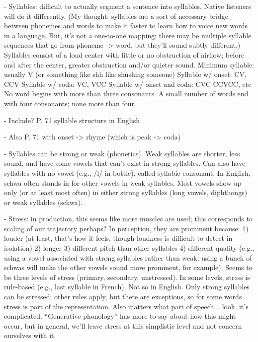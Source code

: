 - Syllables: difficult to actually segment a sentence into syllables.
  Native listeners will do it differently. (My thought: syllables
  are a sort of necessary bridge between phonemes and words to make
  it faster to learn how to voice new words in a language. But,
  it's not a one-to-one mapping; there may be multiple syllable
  sequences that go from phoneme -> word, but they'll sound subtly different.)
  Syllables consist of a loud center with little or no obstruction
  of airflow; before and after the center, greater obstruction and/or
  quieter sound.
  Minimum syllable: usually V (or something like shh like shushing someone)
  Syllable w/ onset: CV, CCV
  Syllable w/ coda: VC, VCC
  Syllable w/ onset and coda: CVC CCVCC, etc
  No word begins with more than three consonants.
  A small number of words end with four consonants; none more than four.

- Include? P. 71 syllable structure in English

- Also P. 71 with onset -> rhyme (which is peak -> coda)

- Syllables can be strong or weak (phonetics).
  Weak syllables are shorter, less sound, and have some vowels
  that can't exist in strong syllables. Can also have syllables
  with no vowel (e.g., /l/ in bottle), called syllabic consonant.
  In English, schwa often stands in for other vowels in weak syllables.
  Most vowels show up only (or at least most often) in either strong
  syllables (long vowels, diphthongs) or weak syllables (schwa).

- Stress: in production, this seems like more muscles are used;
  this corresponds to scaling of our trajectory perhaps?
  In perception, they are prominent because:
  1) louder (at least, that's how it feels, though loudness is
  difficult to detect in isolation)
  2) longer
  3) different pitch than other syllables
  4) different quality (e.g., using a vowel associated with strong
     syllables rather than weak; using a bunch of schwas will make
     the other vowels sound more prominent, for example).
  Seems to be three levels of stress (primary, secondary, unstressed).
  In some levels, stress is rule-based (e.g., last syllable in French).
  Not so in English. Only strong syllables can be stressed;
  other rules apply, but there are exceptions, so for some words
  stress is part of the representation. Also matters what part of speech...
  look, it's complicated. ``Generative phonology'' has more to say
  about how this might occur, but in general, we'll leave stress
  at this simplistic level and not concern ourselves with it.

